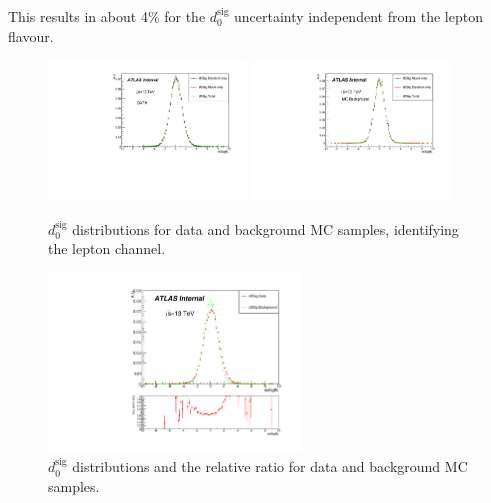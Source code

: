 This results in about 4\% for the $d_{0}^{\textrm{sig}}$ uncertainty independent from the lepton flavour.
\begin{figure}[!h]
\begin{center}
\includegraphics*[width=0.47\textwidth] {figures/d0_data}
\includegraphics*[width=0.47\textwidth] {figures/do_leg}
\caption{$d_{0}^{\textrm{sig}}$ distributions for data and background MC samples, identifying the lepton channel. }
\label{fig:d0lep}
\end{center}
\end{figure}

\begin{figure}[!h]
\begin{center}
\includegraphics*[width=0.6\textwidth] {figures/d0_ratio}
\caption{$d_{0}^{\textrm{sig}}$ distributions and the relative ratio for data and background MC samples. }
\label{fig:d0ratio}
\end{center}
\end{figure}


